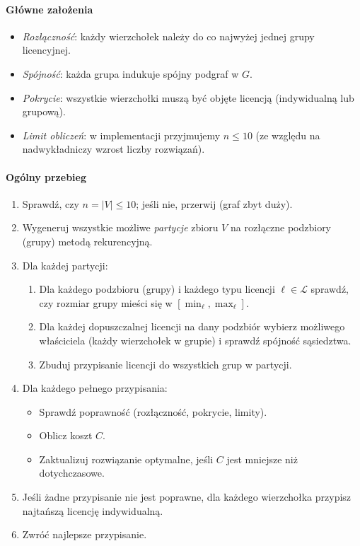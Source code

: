 \paragraph{Główne założenia}
\begin{itemize}
  \item \emph{Rozłączność}: każdy wierzchołek należy do co najwyżej jednej grupy licencyjnej.
  \item \emph{Spójność}: każda grupa indukuje spójny podgraf w $G$.
  \item \emph{Pokrycie}: wszystkie wierzchołki muszą być objęte licencją (indywidualną lub grupową).
  \item \emph{Limit obliczeń}: w implementacji przyjmujemy $n\le10$ (ze względu na nadwykładniczy wzrost liczby rozwiązań).
\end{itemize}

\paragraph{Ogólny przebieg}
\begin{enumerate}
  \item Sprawdź, czy $n=|V|\le10$; jeśli nie, przerwij (graf zbyt duży).
  \item Wygeneruj wszystkie możliwe \emph{partycje} zbioru $V$ na rozłączne podzbiory (grupy) metodą rekurencyjną.
  \item Dla każdej partycji:
    \begin{enumerate}
      \item Dla każdego podzbioru (grupy) i każdego typu licencji $\ell\in\mathcal{L}$ sprawdź, czy rozmiar grupy mieści się w $[\min_\ell,\max_\ell]$.
      \item Dla każdej dopuszczalnej licencji na dany podzbiór wybierz możliwego właściciela (każdy wierzchołek w grupie) i sprawdź spójność sąsiedztwa.
      \item Zbuduj przypisanie licencji do wszystkich grup w partycji.
    \end{enumerate}
  \item Dla każdego pełnego przypisania:
    \begin{itemize}
      \item Sprawdź poprawność (rozłączność, pokrycie, limity).
      \item Oblicz koszt $C$.
      \item Zaktualizuj rozwiązanie optymalne, jeśli $C$ jest mniejsze niż dotychczasowe.
    \end{itemize}
  \item Jeśli żadne przypisanie nie jest poprawne, dla każdego wierzchołka przypisz najtańszą licencję indywidualną.
  \item Zwróć najlepsze przypisanie.
\end{enumerate}

